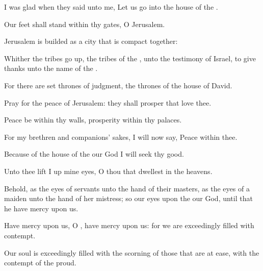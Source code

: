 {\Q {}I was
glad when they
said unto me, Let us
go into the
house of the
{}.


\par }{\Q {}Our
feet shall
stand within thy
gates, O
Jerusalem.


\par }{\Q {}Jerusalem is
builded as a
city that is
compact
together:


\par }{\Q {}Whither the
tribes go
up, the
tribes of the
{}, unto the
testimony of
Israel, to give
thanks unto the
name of the
{}.


\par }{\Q {}For there are
set
thrones of
judgment, the
thrones of the
house of
David.


\par }{\BB \par }
{\Q {}Pray for the
peace of
Jerusalem: they shall
prosper that
love thee.


\par }{\Q {}Peace be within thy
walls,
{}
prosperity within thy
palaces.


\par }{\Q {}For my
brethren and
companions’ sakes, I will now
say,
Peace
{} within thee.


\par }{\Q {}Because of the
house of the
{} our
God I will
seek thy
good.




\par }
{\Q {}Unto thee lift I
up mine
eyes, O thou that
dwellest in the
heavens.


\par }{\Q {}Behold, as the
eyes of
servants
{} unto the
hand of their
masters,
{} as the
eyes of a
maiden unto the
hand of her
mistress; so our
eyes
{} upon the
{} our
God, until that he have
mercy upon us.


\par }{\Q {}Have
mercy upon us, O
{}, have
mercy upon us: for we are
exceedingly
filled with
contempt.


\par }{\Q {}Our
soul is
exceedingly
filled with the
scorning of those that are at
ease,
{} with the
contempt of the
proud.




\par }
